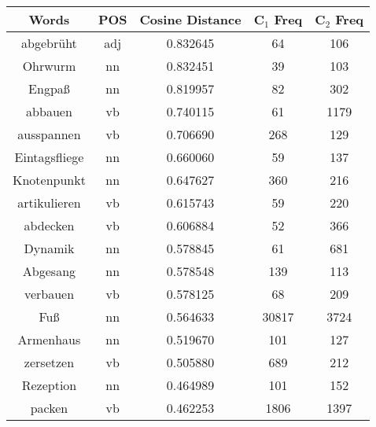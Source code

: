 \begin{table}
\centering
\begin{tabular}{ccccc} 
\toprule
\textbf{ Words }   & \textbf{POS } & \textbf{ Cosine Distance } & \textbf{ C$_1$ Freq } & \textbf{ C$_2$ Freq }  \\ 
\midrule
abgebrüht          & adj           & 0.832645           & 64                 & 106                 \\
Ohrwurm            & nn            & 0.832451           & 39                 & 103                 \\
Engpaß             & nn            & 0.819957           & 82                 & 302                 \\
abbauen            & vb            & 0.740115           & 61                 & 1179                \\
ausspannen         & vb            & 0.706690           & 268                & 129                 \\
Eintagsfliege      & nn            & 0.660060           & 59                 & 137                 \\
Knotenpunkt        & nn            & 0.647627           & 360                & 216                 \\
artikulieren       & vb            & 0.615743           & 59                 & 220                 \\
abdecken           & vb            & 0.606884           & 52                 & 366                 \\
Dynamik            & nn            & 0.578845           & 61                 & 681                 \\
Abgesang           & nn            & 0.578548           & 139                & 113                 \\
verbauen           & vb            & 0.578125           & 68                 & 209                 \\
Fuß                & nn            & 0.564633           & 30817              & 3724                \\
Armenhaus          & nn            & 0.519670           & 101                & 127                 \\
zersetzen          & vb            & 0.505880           & 689                & 212                 \\
Rezeption          & nn            & 0.464989           & 101                & 152                 \\
packen             & vb            & 0.462253           & 1806               & 1397                \\

\end{tabular}
\end{table}
